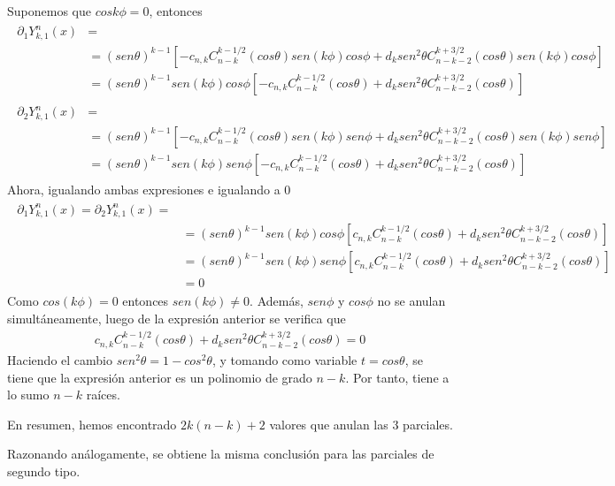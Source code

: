 Suponemos que $cos k\phi = 0 $, entonces
\begin{gather}
\begin{aligned}
 \partial_1  Y_{k,1}^n(x) &= \\ 
 &= (sen\theta)^{k-1}[-c_{n,k}C_{n-k}^{k-1/2}(cos \theta)sen(k\phi)cos\phi + d_k sen^2\theta C_{n-k-2}^{k+3/2}(cos \theta)sen(k\phi)cos\phi] \\ &= (sen\theta)^{k-1}sen(k\phi)cos\phi[-c_{n,k}C_{n-k}^{k-1/2}(cos \theta) + d_k sen^2\theta C_{n-k-2}^{k+3/2}(cos \theta)]
\end{aligned}
\end{gather}
\begin{gather}
\begin{aligned}
\partial_2  Y_{k,1}^n(x) &= \\ 
&= (sen\theta)^{k-1}[-c_{n,k}C_{n-k}^{k-1/2}(cos \theta)sen(k\phi)sen\phi + d_k sen^2\theta C_{n-k-2}^{k+3/2}(cos \theta)sen(k\phi)sen\phi] \\ &= (sen\theta)^{k-1}sen(k\phi)sen\phi[-c_{n,k}C_{n-k}^{k-1/2}(cos \theta) + d_k sen^2\theta C_{n-k-2}^{k+3/2}(cos \theta)]
\end{aligned}
\end{gather}
Ahora, igualando ambas expresiones e igualando a 0
\begin{gather}
\begin{aligned}
	\partial_1  Y_{k,1}^n(x) = \partial_2  Y_{k,1}^n(x) = \\ &= (sen\theta)^{k-1}sen(k\phi)cos\phi[c_{n,k}C_{n-k}^{k-1/2}(cos \theta) + d_k sen^2\theta C_{n-k-2}^{k+3/2}(cos \theta)]  \\ &= (sen\theta)^{k-1}sen(k\phi)sen\phi[c_{n,k}C_{n-k}^{k-1/2}(cos \theta) + d_k sen^2\theta C_{n-k-2}^{k+3/2}(cos \theta)] \\ &= 0
\end{aligned}
\end{gather}
Como $cos (k\phi) = 0 $ entonces $sen  (k\phi) \neq 0$. Además, $sen \phi$ y $cos\phi$ no se anulan simultáneamente, luego de la expresión anterior se verifica que
\begin{gather}
c_{n,k}C_{n-k}^{k-1/2}(cos \theta) + d_k sen^2\theta C_{n-k-2}^{k+3/2}(cos \theta) = 0
\end{gather}
Haciendo el cambio $sen^2 \theta = 1-cos^2\theta$, y tomando como variable $t=cos\theta$, se tiene que la expresión anterior es un polinomio de grado $n-k$. Por tanto, tiene a lo sumo $n-k$ raíces.

\medskip

En resumen, hemos encontrado $2k(n-k)+2$ valores que anulan las 3 parciales.

\medskip
Razonando análogamente, se obtiene la misma conclusión para las parciales de segundo tipo.